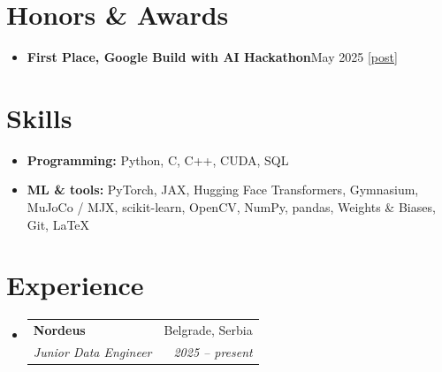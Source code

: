 \documentclass[a4paper,11pt]{article}
\makeatletter
\newcommand{\entry}[4]{
  \vspace{-1pt}\item
  \begin{tabular*}{\linewidth}{l@{\extracolsep{\fill}}r}
    \textbf{#1} & #2 \\
    \textit{\small #3} & \textit{\small #4} \\
  \end{tabular*}\vspace{-4pt}
}
\newcommand{\project}[2]{\item \textbf{#1}\hfill{\small #2}}
\newcommand{\desc}[1]{\par\vspace{1pt}{\small #1\par}}
\newcommand{\entryListStart}{\begin{itemize}[leftmargin=0.15in, label={}, itemsep=5pt, topsep=0pt, parsep=0pt]}
\newcommand{\entryListEnd}{\end{itemize}}
\makeatother
\begin{document}
\section{Honors \& Awards}
\entryListStart
  \project{First Place, Google Build with AI Hackathon}{May 2025 \enspace
    \href{https://lnkd.in/p/dskZhPCW}{[post]}}
  \desc{SafeSpace: multi-agent hate-speech detection platform with a Gemini detector fine-tuned on Serbian data.}
\entryListEnd

\section{Skills}
\entryListStart
  \item \small \textbf{Programming:} Python, C, C++, CUDA, SQL
  \item \small \textbf{ML \& tools:} PyTorch, JAX, Hugging Face Transformers, Gymnasium, MuJoCo / MJX, scikit-learn,
    OpenCV, NumPy, pandas, Weights \& Biases, Git, \LaTeX
\entryListEnd

\section{Experience}
\entryListStart
  \entry{Nordeus}{Belgrade, Serbia}{Junior Data Engineer}{2025 -- present}
\entryListEnd
\end{document}

